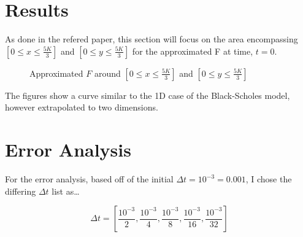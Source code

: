 \documentclass[12pt,letterpaper]{article}
\begin{document}
\newpage

\section*{Results}

As done in the refered paper, this section will focus on the area encompassing $\left[0\leq x \leq \frac{5K}{3}\right]$ and $\left[0\leq y \leq \frac{5K}{3}\right]$ for the approximated F at time, $t=0$.

\begin{figure}[!h]
    \centering
    
    \caption{Approximated $F$ around $\left[0\leq x \leq \frac{5K}{3}\right]$ and $\left[0\leq y \leq \frac{5K}{3}\right]$}
\end{figure}

The figures show a curve similar to the 1D case of the Black-Scholes model, however extrapolated to two dimensions.

\section*{Error Analysis}

For the error analysis, based off of the initial $\Delta t = 10^{-3} = 0.001$,  I chose the differing $\Delta t$ list as\ldots

\begin{equation*}
    \Delta t = \left[\frac{10^{-3}}{2}, \frac{10^{-3}}{4}, \frac{10^{-3}}{8}, \frac{10^{-3}}{16}, \frac{10^{-3}}{32}\right] 
\end{equation*}
\end{document}
